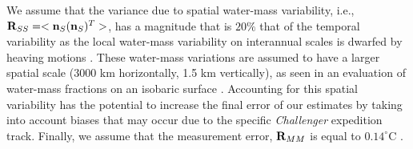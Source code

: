\documentclass[12pt]{article}
\begin{document}
We assume that the variance due to spatial water-mass variability,
i.e., ${\bf R}_{SS} =<{\bf n}_S ({\bf n}_S)^T>$, has a magnitude that
is $20\%$ that of the temporal variability as the local water-mass
variability on interannual scales is dwarfed by heaving motions
\cite{Huang--2015:Heaving}. These water-mass variations are assumed to
have a larger spatial scale ($3000$ km horizontally, 1.5 km vertically),
as seen in an evaluation of water-mass fractions on an isobaric
surface \cite{Gebbie-Huybers-2010:Total}. Accounting for this spatial
variability has the potential to increase the final error of our
estimates by taking into account biases that may occur due to the
specific {\it Challenger} expedition track. Finally, we assume that
the measurement error, ${\bf R}_{MM}$ is equal to $0.14^{\circ}$C
\cite{Roemmich-Gould-2012:135}.

\end{document}
